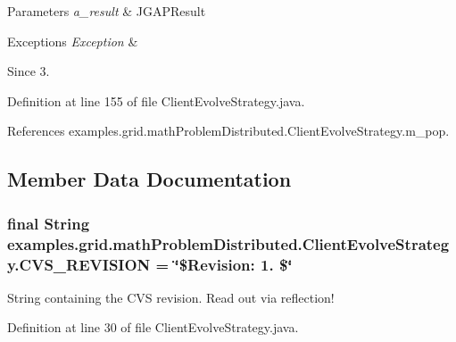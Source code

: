 \begin{DoxyParams}{Parameters}
{\em a\-\_\-result} & J\-G\-A\-P\-Result \\
\hline
\end{DoxyParams}

\begin{DoxyExceptions}{Exceptions}
{\em Exception} & \\
\hline
\end{DoxyExceptions}
\begin{DoxySince}{Since}
3. 
\end{DoxySince}


Definition at line 155 of file Client\-Evolve\-Strategy.\-java.



References examples.\-grid.\-math\-Problem\-Distributed.\-Client\-Evolve\-Strategy.\-m\-\_\-pop.



\subsection{Member Data Documentation}
\hypertarget{classexamples_1_1grid_1_1math_problem_distributed_1_1_client_evolve_strategy_aea23fd80f9fdb26be3ebb3bb3836b84f}{
\subsubsection[{C\-V\-S\-\_\-\-R\-E\-V\-I\-S\-I\-O\-N}]{\setlength{\rightskip}{0pt plus 5cm}final String examples.\-grid.\-math\-Problem\-Distributed.\-Client\-Evolve\-Strategy.\-C\-V\-S\-\_\-\-R\-E\-V\-I\-S\-I\-O\-N = \char`\"{}\$Revision\-: 1. \$\char`\"{}\hspace{0.3cm}{\ttfamily [static]}}}\label{classexamples_1_1grid_1_1math_problem_distributed_1_1_client_evolve_strategy_aea23fd80f9fdb26be3ebb3bb3836b84f}
String containing the C\-V\-S revision. Read out via reflection! 

Definition at line 30 of file Client\-Evolve\-Strategy.\-java.

